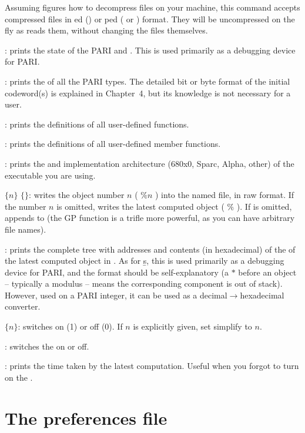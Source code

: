 Assuming  figures how to decompress files on your machine, this
command accepts compressed files in ed () or
ped ( or ) format. They will be uncompressed on
the fly as  reads them, without changing the files themselves.

: prints the state of the PARI  and .
This is used primarily as a debugging device for PARI.

: prints the  of all the PARI
types. The detailed bit or byte format of the initial codeword(s) is
explained in Chapter~4, but its knowledge is not necessary for a  user.

: prints the definitions of all user-defined functions.

: prints the definitions of all user-defined member functions.

: prints the  and implementation architecture
(680x0, Sparc, Alpha, other) of the  executable you are using.

 $\{n\}$ $\{$$\}$: writes the object number
$n$ ( $\%n$ ) into the named file, in raw format. If the number $n$ is
omitted, writes the latest computed object ( $\%$ ). If  is
omitted, appends to  (the GP function  is a trifle more
powerful, as you can have arbitrary file names).

: prints the complete tree with addresses and contents (in
hexadecimal) of the  of the latest computed
object in . As for \b{s}, this is used primarily as a debugging device for
PARI, and the format should be self-explanatory (a $*$ before an object --
typically a modulus -- means the corresponding component is out of stack).
However, used on a PARI integer, it can be used as a
decimal$\rightarrow$hexadecimal converter.

 $\{n\}$: switches  on (1) or off (0). If $n$
is explicitly given, set simplify to $n$.

\subseckbd{\#}: switches the  on or off.

\subseckbd{\#\#}: prints the time taken by the latest computation.
Useful when you forgot to turn on the .


\section{The preferences file}
\label{se:gprc}

